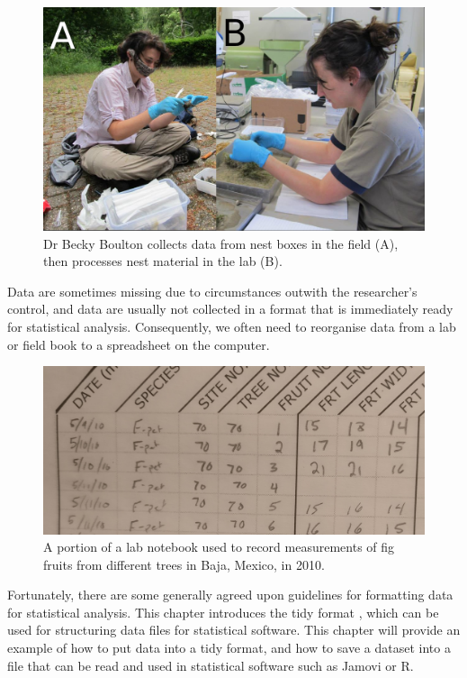 \documentclass[
]{scrbook}
\begin{document}
\begin{figure}
\includegraphics[width=1\linewidth]{img/becky_field} \caption{Dr Becky Boulton collects data from nest boxes in the field (A), then processes nest material in the lab (B).}\label{fig:unnamed-chunk-4}
\end{figure}

Data are sometimes missing due to circumstances outwith the researcher's control, and data are usually not collected in a format that is immediately ready for statistical analysis.
Consequently, we often need to reorganise data from a lab or field book to a spreadsheet on the computer.

\begin{figure}
\includegraphics[width=1\linewidth]{img/handwritten_data} \caption{A portion of a lab notebook used to record measurements of fig fruits from different trees in Baja, Mexico, in 2010.}\label{fig:unnamed-chunk-5}
\end{figure}

Fortunately, there are some generally agreed upon guidelines for formatting data for statistical analysis.
This chapter introduces the tidy format \citep{Wickham2014}, which can be used for structuring data files for statistical software.
This chapter will provide an example of how to put data into a tidy format, and how to save a dataset into a file that can be read and used in statistical software such as Jamovi or R.
\end{document}

